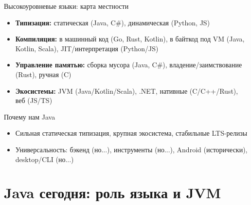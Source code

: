 \documentclass[aspectratio=169]{beamer}
\begin{document}
\begin{frame}{Высокоуровневые языки: карта местности}
  \begin{itemize}
    \item \textbf{Типизация:} статическая (Java, C\#), динамическая (Python, JS)
    \item \textbf{Компиляция:} в машинный код (Go, Rust, Kotlin), 
    в байткод под VM (Java, Kotlin, Scala), JIT/интерпретация (Python/JS)
    \item \textbf{Управление памятью:} сборка мусора (Java, C\#), 
    владение/заимствование (Rust), ручная (C)
    \item \textbf{Экосистемы:} JVM (Java/Kotlin/Scala), 
    .NET, нативные (C/C++/Rust), веб (JS/TS)
  \end{itemize}
  \begin{block}{Почему нам Java}
    \begin{itemize}
      \item Сильная статическая типизация, крупная экосистема, стабильные LTS-релизы
      \item Универсальность: бэкенд (но...), инструменты  (но...), Android (исторически), 
      desktop/CLI  (но...)
    \end{itemize}
  \end{block}
\end{frame}

\section{Java сегодня: роль языка и JVM}
\end{document}
